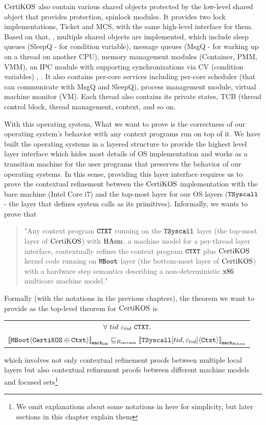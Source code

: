 $\mathrm{CertiKOS}$ also contain various shared objects protected by 
the low-level shared object that provides protection, spinlock modules.
It provides two lock implementations, Ticket and MCS, with the same high-level interface for them. 
Based on that, , 
multiple shared objects are implemented, which include
sleep queues (SleepQ - for condition variable), message queues (MsgQ - for warking up on a thread on another CPU), memory management modules (Container, PMM, VMM), an IPC module with supporting synchronizations via CV (condition variables) , \etc.  
It also contains per-core services including per-core scheduler (that can communicate with MsgQ and SleepQ), process management module,
virtual machine monitor (VM). 
Each thread also contains its private states, TCB (thread control block, thread management, context, and so on. 

With this operating system, 
What we want to prove is the correctness of our operating system's behavior with any context programs run on top of it.
We have built the operating systems in a layered structure to provide the highest level layer interface which hides most details of OS implementation and
works as a transition machine for the user programs that preserves the behavior of our operating systems.  
In this sense, providing this layer interface requires us 
to prove the contextual refinement between the $\mathrm{CertiKOS}$ implementation with the bare machine (Intel Core i7) and 
the top-most layer for our OS layers (${\mathrm{\texttt{TSyscall}}}$ - the layer that defines system calls as its primitives).
Informally, we wants to prove that
\begin{quote}
"Any context program ${\mathrm{\texttt{CTXT}}}$ running on the ${\mathrm{\texttt{TSyscall}}}$ layer (the top-most layer of $\mathrm{CertiKOS}$) with $\mathrm{HAsm}$, a machine model for a per-thread layer interface,
contextually refines the context program ${\mathrm{\texttt{CTXT}}}$ plus $\mathrm{CertiKOS}$ kernel code running on ${\mathrm{\texttt{MBoot}}}$ layer (the bottom-most layer of $\mathrm{CertiKOS}$) with a hardware step semantics describing a non-deterministic $\mathrm{x86}$ multicore machine model."
\end{quote}
Formally (with the notations in the previous chapters), the theorem we want to provide as the top-level theorem for $\mathrm{CertiKOS}$ is 
 \begin{center}
\begin{tabular}{c}
$\forall\ tid\   \oracle_{tid}\ \codeinmath{CTXT},$\\
${[\![{{\mathrm{\texttt{MBoot}}}} \langle {{\mathrm{\texttt{CertiKOS}}} \oplus {\mathrm{\texttt{Ctxt}}}} \rangle]\!]}_{{\mathrm{\texttt{mach}}}_{{\mathrm{\texttt{x86}}}}} \sqsubseteq_{R_{{\mathrm{\texttt{certikos}}}}} {[\![{{\mathrm{\texttt{TSyscall}}}[tid, {\varepsilon}_{tid}]} \langle {{\mathrm{\texttt{Ctxt}}}} \rangle]\!]}_{{{\mathrm{\texttt{mach}}}_{\mathrm{HAsm}}}}$\\
\end{tabular}
\end{center}
which involves not only contextual refinement proofs between multiple local layers but also contextual refinement proofs between
different machine models and focused sets\footnote{We omit explanations about some notations in here for simplicity, but later sections in this chapter explain them}

